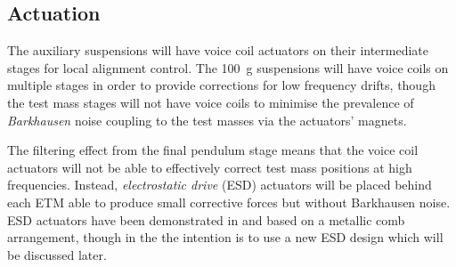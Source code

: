 \subsection{\label{sec:ssm-actuation}Actuation}
The auxiliary suspensions will have voice coil actuators on their intermediate stages for local alignment control. The \SI{100}{\gram} suspensions will have voice coils on multiple stages in order to provide corrections for low frequency drifts, though the test mass stages will not have voice coils to minimise the prevalence of \emph{Barkhausen} noise \cite{Weiss2008} coupling to the test masses via the actuators' magnets.

The filtering effect from the final pendulum stage means that the voice coil actuators will not be able to effectively correct test mass positions at high frequencies. Instead, \emph{electrostatic drive} (\gls{ESD}) actuators will be placed behind each \gls{ETM} able to produce small corrective forces but without Barkhausen noise. \gls{ESD} actuators have been demonstrated in \GEO{} \cite{Hewitson2007} and \ALIGO{} \cite{Aston2012} based on a metallic comb arrangement, though in the \SSMEXPT{} the intention is to use a new \gls{ESD} design which will be discussed later.

